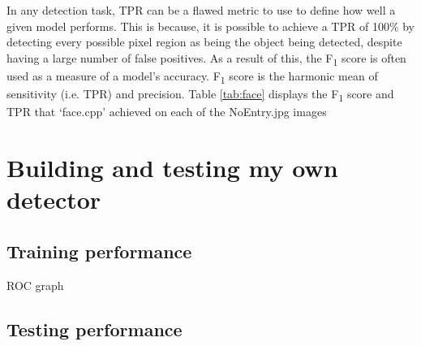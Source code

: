 \documentclass[onecolumn, 11pt, a4paper]{article}
\begin{document}
In any detection task, TPR can be a flawed metric to use to define how well a given model performs.
This is because, it is possible to achieve a TPR of 100\% by detecting every possible pixel region as being the object being detected, despite having a large number of false positives.
As a result of this, the F\textsubscript{1} score is often used as a measure of a model's accuracy.
F\textsubscript{1} score is the harmonic mean of sensitivity (i.e. TPR) and precision.
Table \ref{tab:face} displays the F\textsubscript{1} score and TPR that `face.cpp' achieved on each of the NoEntry\textasteriskcentered.jpg images

\clearpage

\section{Building and testing my own detector}

\subsection{Training performance}

ROC graph

\subsection{Testing performance}
\end{document}
